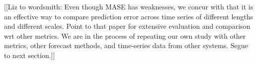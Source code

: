 [[Liz to wordsmith: Even though MASE has weaknesses, we concur with
    \cite{MASE} that it is an effective way to compare prediction
    error across time series of different lengths and different
    scales.  Point to that paper for extensive evaluation and
    comparison wrt other metrics. We are in the process of repeating
    our own study with other metrics, other forecast methods, and
    time-series data from other systems.  Segue to next section.]]







